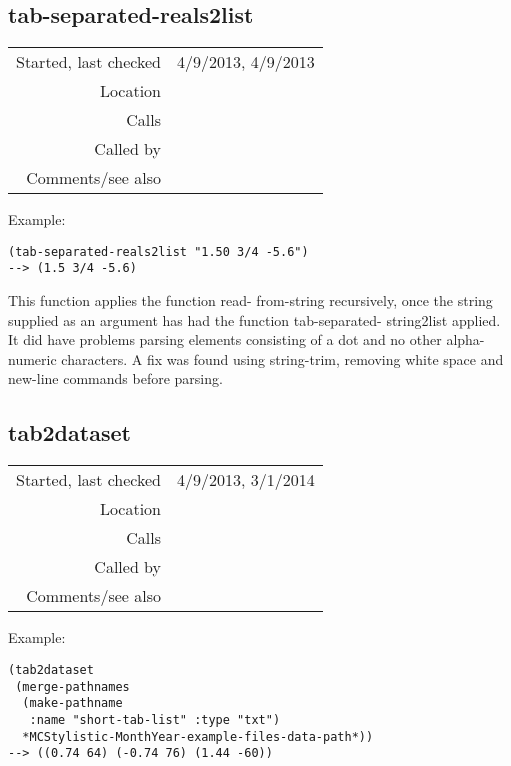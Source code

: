 \subsection*{tab-separated-reals2list}\label{fun:tab-separated-reals2list}

\vspace{0.3cm}
\begin{tabular}{r|p{8cm}}
Started, last checked & 4/9/2013, 4/9/2013 \\
Location & \nameref{sec:csv-files} \\
Calls & \nameref{fun:tab-separated-string2list} \\
Called by & \nameref{fun:tab2dataset} \\
Comments/see also & \nameref{fun:comma-separated-reals2list}
\end{tabular}

\vspace{0.5cm}
\noindent Example:
\begin{verbatim}
(tab-separated-reals2list "1.50	3/4	-5.6")
--> (1.5 3/4 -5.6)
\end{verbatim}

\noindent This function applies the function read-
from-string recursively, once the string supplied as
an argument has had the function tab-separated-
string2list applied. It did have problems parsing
elements consisting of a dot and no other
alpha-numeric characters. A fix was found using
string-trim, removing white space and new-line
commands before parsing.

\subsection*{tab2dataset}\label{fun:tab2dataset}

\vspace{0.3cm}
\begin{tabular}{r|p{8cm}}
Started, last checked & 4/9/2013, 3/1/2014 \\
Location & \nameref{sec:csv-files} \\
Calls & \nameref{fun:tab-separated-reals2list} \\
Called by & \\
Comments/see also & \nameref{fun:csv2dataset}
\end{tabular}

\vspace{0.5cm}
\noindent Example:
\begin{verbatim}
(tab2dataset
 (merge-pathnames
  (make-pathname
   :name "short-tab-list" :type "txt")
  *MCStylistic-MonthYear-example-files-data-path*))
--> ((0.74 64) (-0.74 76) (1.44 -60))
\end{verbatim}

